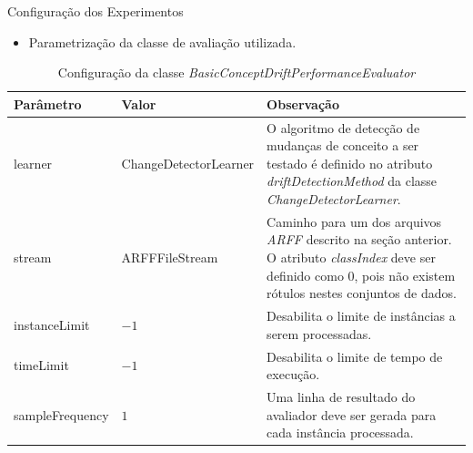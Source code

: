 \documentclass[10pt]{beamer}
\begin{document}
\begin{frame}{Configuração dos Experimentos}
    \begin{itemize}
        \item<1 -> Parametrização da classe de avaliação utilizada.
      \end{itemize}
      \begin{center} 
        \begin{table}[h]
        \resizebox{\textwidth}{!} {%
        \begin{tabular}{llm{7.5cm}}
        \toprule
        Parâmetro & Valor & Observação \\
        \midrule
        learner          & ChangeDetectorLearner  &  O algoritmo de detecção de mudanças de conceito a ser testado é definido no atributo \textit{driftDetectionMethod} da classe \textit{ChangeDetectorLearner}.                   \\
        stream           & ARFFFileStream         &  Caminho para um dos arquivos \textit{ARFF} descrito na seção anterior. O atributo \textit{classIndex} deve ser definido como $0$, pois não existem rótulos nestes conjuntos de dados.  \\ 
        instanceLimit    & $-1$                            &  Desabilita o limite de instâncias a serem processadas.  \\
        timeLimit        & $-1$                            &  Desabilita o limite de tempo de execução.  \\ 
        sampleFrequency  & \hspace{3mm}$1$                 &  Uma linha de resultado do avaliador deve ser gerada para cada instância processada.  \\
        \bottomrule
        \end{tabular}
        }
        \caption{Configuração da classe \textit{BasicConceptDriftPerformanceEvaluator}}
        \label{tbl:configuracao_tarefa}
        \end{table}
    \end{center}
\end{frame}
\end{document}
